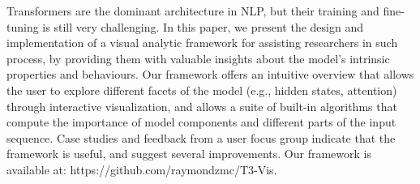 Transformers are the dominant architecture in NLP, but their training and fine-tuning is still very challenging. In this paper, we present the design and implementation of a visual analytic framework for assisting researchers in such process, by providing them with valuable insights about the model's intrinsic properties and behaviours. Our framework offers an intuitive overview that allows the user to explore different facets of the model (e.g., hidden states, attention) through interactive visualization, and allows a suite of built-in algorithms that compute the importance of model components and different parts of the input sequence.  Case studies and feedback from a user focus group indicate that the framework is useful, and suggest several improvements. Our framework is available at: https://github.com/raymondzmc/T3-Vis.